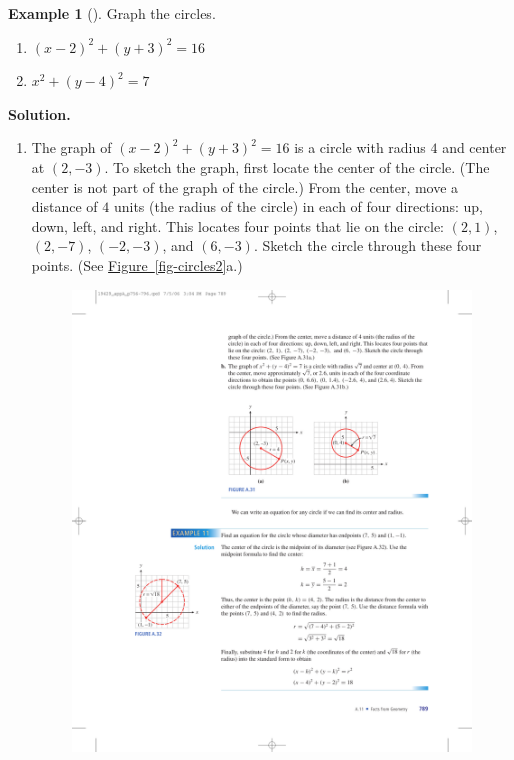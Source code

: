 \documentclass[10pt,]{book}
\theoremstyle{plain}
\theoremstyle{definition}
\theoremstyle{definition}
\newtheorem{example}[theorem]{Example}
\theoremstyle{definition}
\numberwithin{equation}{part}
\begin{document}
\begin{example}[]\label{example-88}
Graph the circles. \leavevmode%
\begin{enumerate}[label=*\alph**]
\item\hypertarget{li-378}{}\((x − 2)^2 + (y + 3)^2 = 16\)%
\item\hypertarget{li-379}{}\(x^2 + (y − 4)^2 = 7\)%
\end{enumerate}
%
\par\medskip\noindent%
\textbf{Solution.}\quad \leavevmode%
\begin{enumerate}[label=*\alph**]
\item\hypertarget{li-380}{}The graph of \((x − 2)^2 + (y + 3)^2 = 16\) is a circle with radius \(4\) and center at \((2, −3)\). To sketch the graph, first locate the center of the circle. (The center is not part of the graph of the circle.) From the center, move a distance of \(4\) units (the radius of the circle) in each of four directions: up, down, left, and right. This locates four points that lie on the circle: \((2, 1)\), \((2, −7)\), \((−2, −3)\), and \((6, −3)\). Sketch the circle through these four points. (See \hyperref[fig-circles2]{Figure~\ref{fig-circles2}}a.) \leavevmode%
\begin{figure}
\centering
\includegraphics[width=1\linewidth]{images/fig-circles2}

\end{figure}
\end{enumerate}
\end{example}
\end{document}
